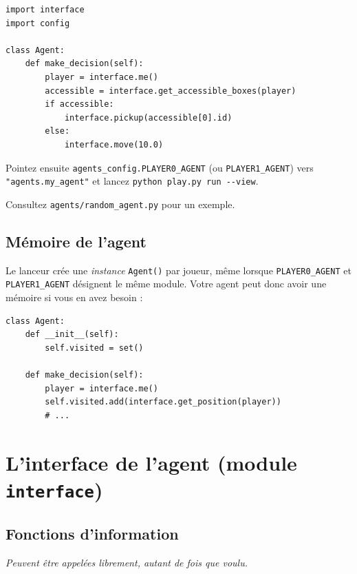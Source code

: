 \documentclass[11pt,a4paper]{article}
\newcommand{\code}[1]{\texttt{#1}}
\begin{document}
\begin{lstlisting}
import interface
import config

class Agent:
    def make_decision(self):
        player = interface.me()
        accessible = interface.get_accessible_boxes(player)
        if accessible:
            interface.pickup(accessible[0].id)
        else:
            interface.move(10.0)
\end{lstlisting}

Pointez ensuite \code{agents\_config.PLAYER0\_AGENT} (ou
\code{PLAYER1\_AGENT}) vers \code{"agents.my\_agent"} et lancez
\code{python play.py run -{}-view}.

Consultez \code{agents/random\_agent.py} pour un exemple.

\subsection{Mémoire de l'agent}
\label{sec:memory}

Le lanceur crée une \emph{instance} \code{Agent()} par joueur, même lorsque
\code{PLAYER0\_AGENT} et \code{PLAYER1\_AGENT} désignent le même module.
Votre agent peut donc avoir une mémoire si vous en avez besoin :

\begin{lstlisting}
class Agent:
    def __init__(self):
        self.visited = set()

    def make_decision(self):
        player = interface.me()
        self.visited.add(interface.get_position(player))
        # ...
\end{lstlisting}

\newpage
\section{L'interface de l'agent (module \code{interface})}

\subsection{Fonctions d'information}
\emph{Peuvent être appelées librement, autant de fois que voulu.}
\end{document}
